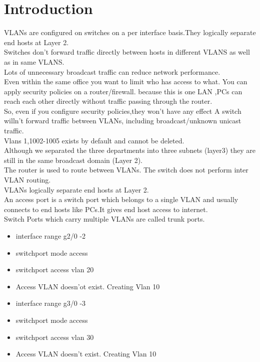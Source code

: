 \documentclass{report}
\begin{document}
	\section{Introduction}
	VLANs are configured on switches on a per interface basis.They logically
	separate end hosts at Layer 2. \\ Switches don't forward traffic directly
	between hosts in different VLANS as well as in same VLANS. \\ Lots of unnecessary
	broadcast traffic can reduce network performance.\\ Even within the same office
	you want to limit who has access to what. You can apply security policies on a
	router/firewall. because this is one LAN ,PCs can reach each other directly
	without traffic passing through the router.\\ So, even if you configure security
	policies,they won't have any effect A switch willn't forward traffic between VLANs,
	including broadcast/unknown unicast traffic.\\ Vlans 1,1002-1005 exists by
	default and cannot be deleted.\\ Although we separated the three departments
	into three subnets (layer3) they are still in the same broadcast domain (Layer
	2).\\ The router is used to route between VLANs. The switch does not perform inter
	VLAN routing.\\ VLANs logically separate end hosts at Layer 2.\\ An access
	port is a switch port which belongs to a single VLAN and usually connects to
	end hosts like PCs.It gives end host access to internet.\\ Switch Ports which
	carry multiple VLANs are called trunk ports.
	\begin{itemize}
		\item interface range g2/0 -2

		\item switchport mode access

		\item switchport access vlan 20

		\item Access VLAN doesn'ot exist. Creating Vlan 10
	\end{itemize}
	\begin{itemize}
		\item interface range g3/0 -3

		\item switchport mode access

		\item switchport access vlan 30

		\item Access VLAN doesn't exist. Creating Vlan 10
	\end{itemize}
\end{document}
